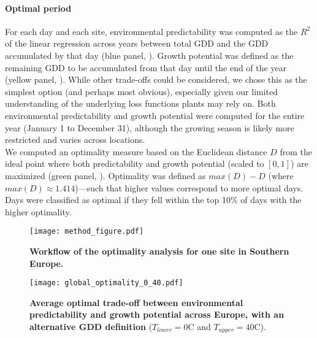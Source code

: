 \documentclass[11pt,letter]{article}
\begin{document}
\paragraph{Optimal period} For each day and each site, environmental predictability was computed as the $R^2$ of the linear regression across years between total GDD and the GDD accumulated by that day (blue panel, ). Growth potential was defined as the remaining GDD to be accumulated from that day until the end of the year (yellow panel, ). While other trade-offs could be considered, we chose this as the simplest option (and perhaps most obvious), especially given our limited understanding of the underlying loss functions plants may rely on. Both environmental predictability and growth potential were computed for the entire year (January 1 to December 31), although the growing season is likely more restricted and varies across locations. \\
We computed an optimality measure based on the Euclidean distance $D$ from  the ideal point where both predictability and growth potential (scaled to $[0,1]$) are maximized (green panel, ). Optimality was defined as $max(D)-D$ (where $max(D)\approx1.414$)---such that higher values correspond to more optimal days. Days were classified as optimal if they fell within the top 10\% of days with the higher optimality.

\begin{figure}[hb]
\hspace*{-1.4cm}
\texttt{[image: method\_figure.pdf]}
\vspace*{-0.4cm}
\caption{\textbf{Workflow of the optimality analysis for one site in Southern Europe.}} %
\label{fig:method}
\end{figure}

\clearpage

\begin{figure}[h]
\centering
\texttt{[image: global\_optimality\_0\_40.pdf]} %
\vspace*{-0.4cm}
\caption{\textbf{Average optimal trade-off between environmental predictability and growth potential across Europe, with an alternative GDD definition} ($T_{lower}=0$\degree C and $T_{upper}=40$\degree C).}
\label{fig:altgdd}
\end{figure}
\end{document}
